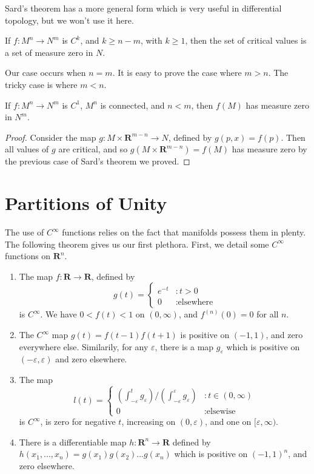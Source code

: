Sard's theorem has a more general form which is very useful in differential topology, but we won't use it here.

\begin{theorem}[Sard]
    If $f: M^n \to N^m$ is $C^k$, and $k \geq n-m$, with $k \geq 1$, then the set of critical values is a set of measure zero in $N$.
\end{theorem}

Our case occurs when $n = m$. It is easy to prove the case where $m > n$. The tricky case is where $m < n$.

\begin{theorem}
    If $f:M^n \to N^m$ is $C^1$, $M^n$ is connected, and $n < m$, then $f(M)$ has measure zero in $N^m$.
\end{theorem}
\begin{proof}
    Consider the map $g: M \times \mathbf{R}^{m-n} \to N$, defined by $g(p,x) = f(p)$. Then all values of $g$ are critical, and so $g(M \times \mathbf{R}^{m-n}) = f(M)$ has measure zero by the previous case of Sard's theorem we proved.
\end{proof}

\section{Partitions of Unity}

The use of $C^\infty$ functions relies on the fact that manifolds possess them in plenty. The following theorem gives us our first plethora. First, we detail some $C^\infty$ functions on $\mathbf{R}^n$.

\begin{enumerate}
    \item The map $f:\mathbf{R} \to \mathbf{R}$, defined by
    \[
    g(t) =
    \begin{cases}
        e^{-t} & : t > 0\\
        0 & : \text{elsewhere}
    \end{cases}
    \]
    is $C^\infty$. We have $0 < f(t) < 1$ on $(0,\infty)$, and $f^{(n)}(0) = 0$ for all $n$.
    \item The $C^\infty$ map $g(t) = f(t-1)f(t+1)$ is positive on $(-1,1)$, and zero everywhere else. Similarily, for any $\varepsilon$, there is a map $g_\varepsilon$ which is positive on $(-\varepsilon, \varepsilon)$ and zero elsewhere.
    \item The map 
    \[ l(t) = \begin{cases}
        \left(\int_{-\varepsilon}^t g_\varepsilon \right)/\left(\int_{-\varepsilon}^\varepsilon g_\varepsilon \right) & : t \in (0, \infty) \\
        0 & : \text{elsewise}
    \end{cases} \]
    is $C^\infty$, is zero for negative $t$, increasing on $(0, \varepsilon)$, and one on $[\varepsilon, \infty)$.
    \item There is a differentiable map $h:\mathbf{R}^n \to \mathbf{R}$ defined by $h(x_1, \dots, x_n) = g(x_1) g(x_2) \dots g(x_n)$ which is positive on $(-1, 1)^n$, and zero elsewhere.
\end{enumerate}

